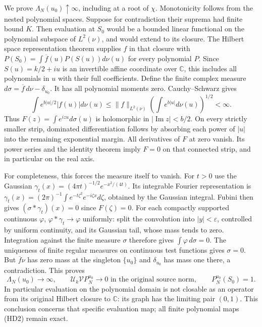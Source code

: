 \documentclass{article}
\begin{document}
We prove $\Lambda_N(u_0)\uparrow\infty$, including at a root of $\chi$.
Monotonicity follows from the nested polynomial spaces. Suppose for
contradiction their suprema had finite bound $K$. Then evaluation at
$S_0$ would be a bounded linear functional on the polynomial subspace
of $L^2(\nu)$, and would extend to its closure. The Hilbert space
representation theorem supplies $f$ in that closure with
$P(S_0)=\int\overline f(u)P(S(u))d\nu(u)$ for every polynomial $P$.
Since $S(u)=k/2+iu$ is an invertible affine coordinate over $\mathbb C$,
this includes all polynomials in $u$ with their full coefficients.
Define the finite complex measure
$d\sigma=\overline f\,d\nu-\delta_{u_0}$.
It has all polynomial moments zero. Cauchy--Schwarz gives
\[
 \int e^{b|u|/2}|f(u)|d\nu(u)
 \le\|f\|_{L^2(\nu)}
       \left(\int e^{b|u|}d\nu(u)\right)^{1/2}<\infty.
 \tag{HD4}
\]
Thus $F(z)=\int e^{izu}d\sigma(u)$ is holomorphic in
$|\operatorname{Im}z|<b/2$. On every strictly smaller strip,
dominated differentiation follows by absorbing each power of $|u|$
into the remaining exponential margin. All derivatives of $F$ at zero
vanish. Its power series and the identity theorem imply $F=0$ on
that connected strip, and in particular on the real axis.

For completeness, this forces the measure itself to vanish. For $t>0$
use the Gaussian $\gamma_t(x)=(4\pi t)^{-1/2}e^{-x^2/(4t)}$.
Its integrable Fourier representation is
$\gamma_t(x)=(2\pi)^{-1}\int e^{-t\zeta^2}e^{-i\zeta x}d\zeta$,
obtained by the Gaussian integral. Fubini then gives
$(\sigma*\gamma_t)(x)=0$ since $F(\zeta)=0$.
For each compactly supported continuous $\varphi$,
$\varphi*\gamma_t\to\varphi$ uniformly: split the convolution
into $|y|<\varepsilon$, controlled by uniform continuity, and its
Gaussian tail, whose mass tends to zero. Integration against the
finite measure $\sigma$ therefore gives $\int\varphi\,d\sigma=0$.
The uniqueness of finite regular measures on continuous test functions
gives $\sigma=0$. But $\overline f\nu$ has zero mass at the singleton
$\{u_0\}$ and $\delta_{u_0}$ has mass one there, a contradiction.
This proves
\[
 \Lambda_N(u_0)\longrightarrow\infty,
 \qquad \mathcal U_k\mathcal V P_N^{u_0}\longrightarrow0
       \text{ in the original source norm},\qquad
 P_N^{u_0}(S_0)=1 .
 \tag{HD5}
\]
In particular evaluation on the polynomial domain is not closable as
an operator from its original Hilbert closure to $\mathbb C$: its
graph has the limiting pair $(0,1)$. This conclusion concerns that
specific evaluation map; all finite polynomial maps (HD2) remain exact.
\end{document}
